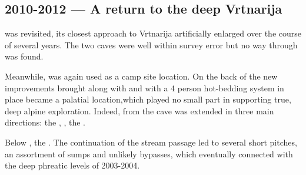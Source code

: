 \subsection{2010-2012 --- A return to the deep Vrtnarija} 
 was revisited, its closest approach to Vrtnarija artificially enlarged over the course of several years. The two caves were well within survey error but no way through was found. 

Meanwhile,  was again used as a camp site location. On the back of the new improvements brought along with  and with a 4 person hot-bedding system in place  became a palatial location,which played no small part in supporting true, deep alpine exploration. Indeed, from  the cave was extended in three main directions: the , , the .

Below , the . The continuation of the stream passage led to several short pitches, an assortment of sumps and unlikely bypasses, which eventually connected with the deep phreatic levels of 2003-2004.


